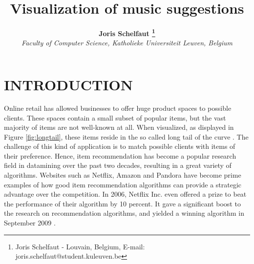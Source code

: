 \documentclass[a4paper,10pt,twocolumn]{article}
\title{\bf
	Visualization of music suggestions
}
\author{
        \small{\bf
        	Joris Schelfaut
        	\footnote{
        			Joris Schelfaut - Louvain, Belgium, E-mail: joris.schelfaut@student.kuleuven.be
        }} \\
        \small{\emph{
        	Faculty of Computer Science, Katholieke Universiteit Leuven, Belgium
        }}
}
\date{}
\begin{document}
\maketitle


\section*{INTRODUCTION}

Online retail has allowed businesses to offer huge product spaces to possible clients. These spaces contain a small subset of popular items, but the vast majority of items are not well-known at all. When visualized, as displayed in Figure \ref{fig:longtail}, these items reside in the so called long tail of the curve \cite{rajaraman2012}. The challenge of this kind of application is to match possible clients with items of their preference. Hence, item recommendation has become a popular research field in datamining over the past two decades, resulting in a great variety of algorithms. Websites such as Netflix, Amazon and Pandora have become prime examples of how good item recommendation algorithms can provide a strategic advantage over the competition. In 2006, Netflix Inc. even offered a prize to beat the performance of their algorithm by 10 percent. It gave a significant boost to the research on recommendation algorithms, and yielded a winning algorithm in September 2009 \cite{rajaraman2012, bell2007}.
\end{document}
